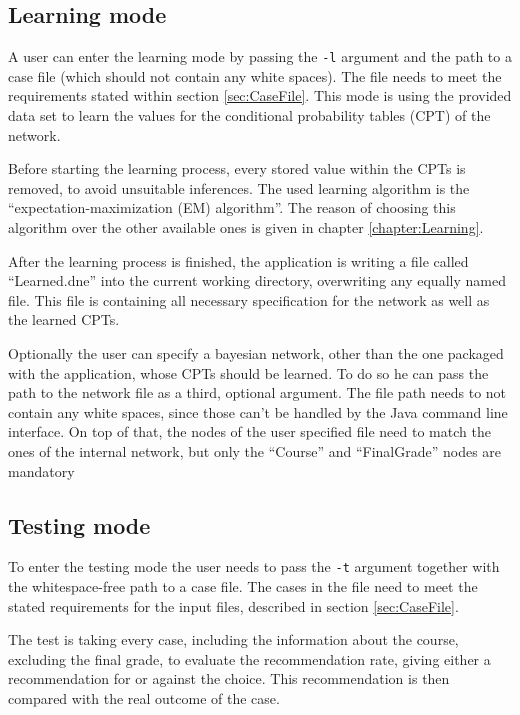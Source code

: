 \documentclass[%
	pdftex,
	oneside,        %
	11pt,           %
	parskip=half,   %
	headsepline,    %
	footsepline,    %
	abstracton,     %
	USenglish,      %
	a4paper,        %
]{report}
\begin{document}
\subsection{Learning mode}
A user can enter the learning mode by passing the \texttt{-l} argument and the path to a case file (which should not contain any white spaces). The file needs to meet the requirements stated within section \vref{sec:CaseFile}. This mode is using the provided data set to learn the values for the conditional probability tables (CPT) of the network.

Before starting the learning process, every stored value within the CPTs is removed, to avoid unsuitable inferences. The used learning algorithm is the \enquote{expectation-maximization (EM) algorithm}. The reason of choosing this algorithm over the other available ones is given in chapter \vref{chapter:Learning}.

After the learning process is finished, the application is writing a file called \enquote{Learned.dne} into the current working directory, overwriting any equally named file. This file is containing all necessary specification for the network as well as the learned CPTs.

Optionally the user can specify a bayesian network, other than the one packaged with the application, whose CPTs should be learned. To do so he can pass the path to the network file as a third, optional argument. The file path needs to not contain any white spaces, since those can't be handled by the Java command line interface. On top of that, the nodes of the user specified file need to match the ones of the internal network, but only the \enquote{Course} and \enquote{FinalGrade} nodes are mandatory

\subsection{Testing mode}
\label{sec:Test}
To enter the testing mode the user needs to pass the \texttt{-t} argument together with the whitespace-free path to a case file. The cases in the file need to meet the stated requirements for the input files, described in section \vref{sec:CaseFile}.

The test is taking every case, including the information about the course, excluding the final grade, to evaluate the recommendation rate, giving either a recommendation for or against the choice. This recommendation is then compared with the real outcome of the case.
\end{document}
